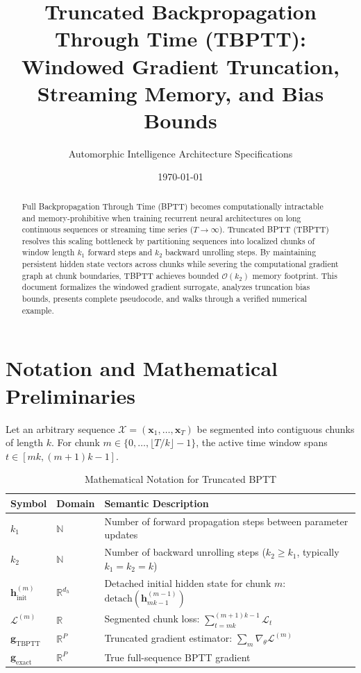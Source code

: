 \documentclass[11pt,a4paper]{article}
\title{Truncated Backpropagation Through Time (TBPTT): Windowed Gradient Truncation, Streaming Memory, and Bias Bounds}
\author{Automorphic Intelligence Architecture Specifications}
\date{\today}
\theoremstyle{definition}
\begin{document}
\maketitle

\begin{abstract}
Full Backpropagation Through Time (BPTT) becomes computationally intractable and memory-prohibitive when training recurrent neural architectures on long continuous sequences or streaming time series ($T \to \infty$). Truncated BPTT (TBPTT) resolves this scaling bottleneck by partitioning sequences into localized chunks of window length $k_1$ forward steps and $k_2$ backward unrolling steps. By maintaining persistent hidden state vectors across chunks while severing the computational gradient graph at chunk boundaries, TBPTT achieves bounded $\mathcal{O}(k_2)$ memory footprint. This document formalizes the windowed gradient surrogate, analyzes truncation bias bounds, presents complete pseudocode, and walks through a verified numerical example.
\end{abstract}

\section{Notation and Mathematical Preliminaries}

Let an arbitrary sequence $\mathcal{X} = (\mathbf{x}_1, \dots, \mathbf{x}_T)$ be segmented into contiguous chunks of length $k$. For chunk $m \in \{0, \dots, \lfloor T/k \rfloor - 1\}$, the active time window spans $t \in [mk, (m+1)k - 1]$.

\begin{table}[h]
\centering
\caption{Mathematical Notation for Truncated BPTT}
\begin{tabular}{lll}
\toprule
\textbf{Symbol} & \textbf{Domain} & \textbf{Semantic Description} \\
\midrule
$k_1$ & $\mathbb{N}$ & Number of forward propagation steps between parameter updates \\
$k_2$ & $\mathbb{N}$ & Number of backward unrolling steps ($k_2 \ge k_1$, typically $k_1 = k_2 = k$) \\
$\mathbf{h}_{\text{init}}^{(m)}$ & $\mathbb{R}^{d_h}$ & Detached initial hidden state for chunk $m$: $\text{detach}(\mathbf{h}_{mk-1}^{(m-1)})$ \\
$\mathcal{L}^{(m)}$ & $\mathbb{R}$ & Segmented chunk loss: $\sum_{t=mk}^{(m+1)k - 1} \mathcal{L}_t$ \\
$\mathbf{g}_{\text{TBPTT}}$ & $\mathbb{R}^P$ & Truncated gradient estimator: $\sum_m \nabla_\theta \mathcal{L}^{(m)}$ \\
$\mathbf{g}_{\text{exact}}$ & $\mathbb{R}^P$ & True full-sequence BPTT gradient \\
\bottomrule
\end{tabular}
\end{table}
\end{document}
